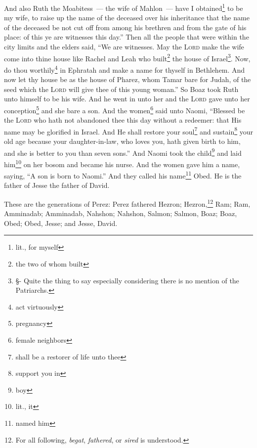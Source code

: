\begin{inparaenum}
     And also Ruth the Moabitess~--- the wife of Mahlon~--- have I obtained\footnote{lit., for myself} to be my wife, to raise up the name of the deceased over his inheritance that the name of the deceased be not cut off from among his brethren and from the gate of his place: of this ye are witnesses this day.''%
     Then all the people that were within the city limits and the elders said, ``We are witnesses. May the \textsc{Lord} make the wife come into thine house like Rachel and Leah who built\footnote{the two of whom built} the house of Israel\footnote{\S - Quite the thing to say especially considering there is no mention of the Patriarchs.}. Now, do thou worthily\footnote{act virtuously} in Ephratah and make a name for thyself in Bethlehem.%
     And now let thy house be as the house of Pharez, whom Tamar bare for Judah, of the seed which the \textsc{Lord} will give thee of this young woman.''%
     So Boaz took Ruth unto himself to be his wife. And he went in unto her and the \textsc{Lord} gave unto her conception\footnote{pregnancy} and she bare a son.%
     And the women\footnote{female neighbors} said unto Naomi, ``Blessed be the \textsc{Lord} who hath not abandoned thee this day without a redeemer: that His name may be glorified in Israel.%
     And He shall restore your soul\footnote{shall be a restorer of life unto thee} and sustain\footnote{support you in} your old age because your daughter-in-law, who loves you, hath given birth to him, and she is better to you than seven sons.''%
     And Naomi took the child\footnote{boy} and laid him\footnote{lit., it} on her bosom and became his nurse.%
     And the women gave him a name, saying, ``A son is born to Naomi.'' And they called his name\footnote{named him} Obed. He is the father of Jesse the father of David.%
    
     These are the generations of Perez: Perez fathered Hezron;%
     Hezron,\footnote{For all following, \textit{begat}, \textit{fathered}, or \textit{sired} is understood.} Ram; Ram, Amminadab;%
     Amminadab, Nahshon; Nahshon, Salmon;%
     Salmon, Boaz; Boaz, Obed;%
     Obed, Jesse; and Jesse, David.%
\end{inparaenum}
